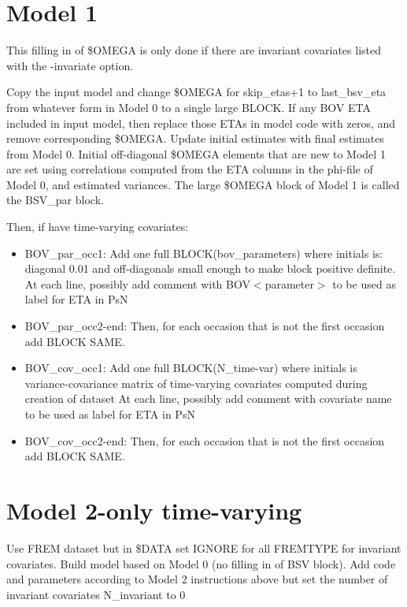  

\section{Model 1}
This filling in of \$OMEGA is only done if there are invariant covariates listed with the -invariate option.

Copy the input model and change \$OMEGA for skip\_etas+1 to last\_bsv\_eta
from whatever form in Model 0 to a single large BLOCK. If any BOV ETA included in input model,
then replace those ETAs in model code with zeros, and remove corresponding \$OMEGA.
Update initial estimates with final estimates from Model 0.
Initial off-diagonal \$OMEGA elements that are new to Model 1 are set using
correlations computed from the ETA columns in the phi-file of Model 0, and estimated variances.
The large \$OMEGA block of Model 1 is called the BSV\_par block.

Then, if have time-varying covariates:
\begin{itemize}
\item BOV\_par\_occ1: Add one full BLOCK(bov\_parameters) where initials is: diagonal 0.01 and off-diagonals small enough to make
block positive definite.
At each line, possibly add comment with BOV$<$parameter$>$ to be used as label for ETA in PsN
\item BOV\_par\_occ2-end: Then, for each occasion that is not the first occasion add BLOCK SAME.
\item BOV\_cov\_occ1: Add one full BLOCK(N\_time-var) where initials is variance-covariance matrix of time-varying covariates computed during creation of dataset
At each line, possibly add comment with covariate name to be used as label for ETA in PsN
\item BOV\_cov\_occ2-end: Then, for each occasion that is not the first occasion add BLOCK SAME.
\end{itemize}

\section{Model 2-only time-varying}
Use FREM dataset but in \$DATA set IGNORE for all FREMTYPE for invariant covariates. Build model based on Model 0 (no filling in of BSV block). Add code and parameters according to Model 2 instructions above but set the number of invariant covariates N\_invariant to 0

